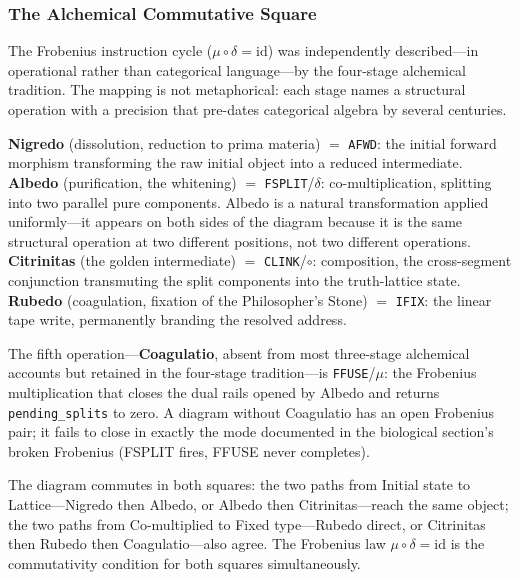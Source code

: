 \documentclass[12pt,a4paper]{article}
\begin{document}
\subsubsection{The Alchemical Commutative Square}

The Frobenius instruction cycle ($\mu \circ \delta = \mathrm{id}$) was independently described---in operational rather than categorical language---by the four-stage alchemical tradition. The mapping is not metaphorical: each stage names a structural operation with a precision that pre-dates categorical algebra by several centuries.

\textbf{Nigredo} (dissolution, reduction to prima materia) $=$ \texttt{AFWD}: the initial forward morphism transforming the raw initial object into a reduced intermediate. \textbf{Albedo} (purification, the whitening) $=$ \texttt{FSPLIT}/$\delta$: co-multiplication, splitting into two parallel pure components. Albedo is a natural transformation applied uniformly---it appears on both sides of the diagram because it is the same structural operation at two different positions, not two different operations. \textbf{Citrinitas} (the golden intermediate) $=$ \texttt{CLINK}/$\circ$: composition, the cross-segment conjunction transmuting the split components into the truth-lattice state. \textbf{Rubedo} (coagulation, fixation of the Philosopher's Stone) $=$ \texttt{IFIX}: the linear tape write, permanently branding the resolved address.

The fifth operation---\textbf{Coagulatio}, absent from most three-stage alchemical accounts but retained in the four-stage tradition---is \texttt{FFUSE}/$\mu$: the Frobenius multiplication that closes the dual rails opened by Albedo and returns \texttt{pending\_splits} to zero. A diagram without Coagulatio has an open Frobenius pair; it fails to close in exactly the mode documented in the biological section's broken Frobenius (FSPLIT fires, FFUSE never completes).

The diagram commutes in both squares: the two paths from Initial state to Lattice---Nigredo then Albedo, or Albedo then Citrinitas---reach the same object; the two paths from Co-multiplied to Fixed type---Rubedo direct, or Citrinitas then Rubedo then Coagulatio---also agree. The Frobenius law $\mu \circ \delta = \mathrm{id}$ is the commutativity condition for both squares simultaneously.
\end{document}
